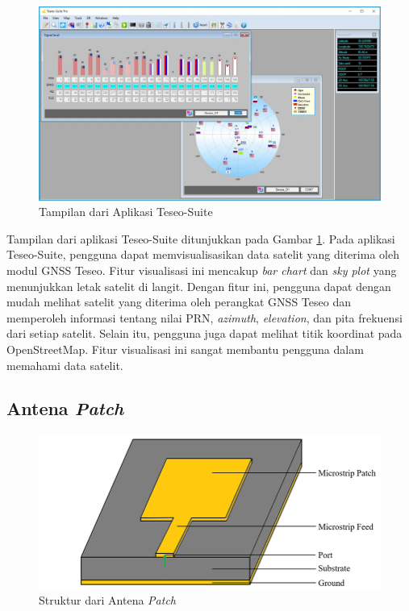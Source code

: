 \begin{figure}[H]
	\centering
	\includegraphics[width=13cm]{contents/chapter-2/teseo-suite.jpeg}
	\caption{Tampilan dari Aplikasi Teseo-Suite}
	\label{Fig: teseo-suite-ss}
\end{figure}

Tampilan dari aplikasi Teseo-Suite ditunjukkan pada Gambar \ref{Fig: teseo-suite-ss}. Pada aplikasi Teseo-Suite, pengguna dapat memvisualisasikan data satelit yang diterima oleh modul GNSS Teseo. Fitur visualisasi ini mencakup \textit{bar chart} dan \textit{sky plot} yang menunjukkan letak satelit di langit. Dengan fitur ini, pengguna dapat dengan mudah melihat satelit yang diterima oleh perangkat GNSS Teseo dan memperoleh informasi tentang nilai PRN, \textit{azimuth}, \textit{elevation}, dan pita frekuensi dari setiap satelit. Selain itu, pengguna juga dapat melihat titik koordinat pada OpenStreetMap. Fitur visualisasi ini sangat membantu pengguna dalam memahami data satelit.

\subsection{Antena \textit{Patch}}
\begin{figure}[ht]
	\centering
	\includegraphics[width=12cm]{contents/chapter-2/patch-antena.jpg}
	\caption{Struktur dari Antena \textit{Patch} \cite{Chowdhury2019}}
	\label{Fig: patch-antenna}
\end{figure}

